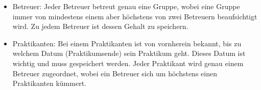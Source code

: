         \begin{itemize}
          \item Betreuer: Jeder Betreuer betreut genau eine Gruppe, wobei eine Gruppe immer von mindestens einem aber höchstens von zwei Betreuern beaufsichtigt wird. Zu jedem Betreuer ist dessen Gehalt zu speichern.

          \item Praktikanten: Bei einem Praktikanten ist von vornherein bekannt, bis zu welchem Datum (Praktikumsende) sein Praktikum geht. Dieses Datum ist wichtig und muss gespeichert werden. Jeder Praktikant wird genau einem Betreuer zugeordnet, wobei ein Betreuer sich um höchstens einen Praktikanten kümmert.
        \end{itemize}
\clearpage
